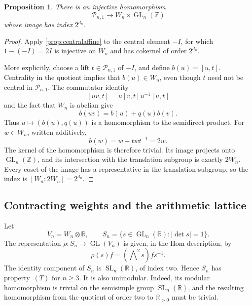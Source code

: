 \documentclass[11pt,a4paper]{article}
\newtheorem{proposition}[theorem]{Proposition}
\theoremstyle{definition}
\newcommand{\R}{\mathbb R}
\newcommand{\Z}{\mathbb Z}
\newcommand{\SL}{\operatorname{SL}}
\newcommand{\GL}{\operatorname{GL}}
\newcommand{\rt}{(T)}
\begin{document}
\begin{proposition}\label{prop:autaffinerealization}
There is an injective homomorphism
\[
 \mathcal{P}_{n,1}\longrightarrow W_n\rtimes\GL_n(\Z)
\]
whose image has index \(2^{d_n}\).
\end{proposition}
\begin{proof}
Apply \cref{prop:centralaffine} to the central element
\(-I\), for which \(1-(-I)=2I\) is injective on \(W_n\)
and has cokernel of order \(2^{d_n}\).

More explicitly, choose a lift \(t\in\mathcal{P}_{n,1}\) of
\(-I\), and define \(b(u)=[u,t]\). Centrality in the quotient
implies that \(b(u)\in W_n\), even though \(t\) need not be
central in \(\mathcal{P}_{n,1}\). The commutator identity
\[
 [uv,t]=u[v,t]u^{-1}[u,t]
\]
and the fact that \(W_n\) is abelian give
\[b(uv)=b(u)+q(u)b(v).\] 
Thus
\(u\mapsto(b(u),q(u))\) is a homomorphism to the semidirect
product. For \(w\in W_n\), written additively,
\[
 b(w)=w-twt^{-1}=2w.
\]
The kernel of the homomorphism is therefore trivial. Its image
projects onto \(\GL_n(\Z)\), and its intersection with the
translation subgroup is exactly \(2W_n\). Every coset of the
image has a representative in the translation subgroup, so the
index is \([W_n:2W_n]=2^{d_n}\).
\end{proof}


\subsection{Contracting weights and the arithmetic lattice}

Let
\[
 V_n=W_n\otimes\R,
 \qquad
 S_n=\{s\in\GL_n(\R):|\det s|=1\}.
\]
The representation \(\rho:S_n\to\GL(V_n)\) is given, in the
Hom description, by
\[
 \rho(s)f=\left(\bigwedge\nolimits^2s\right)f s^{-1}.
\]
The identity component of \(S_n\) is \(\SL_n(\R)\), of index
two. Hence \(S_n\) has property~\(\rt\) for \(n\ge3\).
It is also unimodular. Indeed, its modular homomorphism is
trivial on the semisimple group \(\SL_n(\R)\), and the
resulting homomorphism from the quotient of order two to
\(\R_{>0}\) must be trivial.
\end{document}
